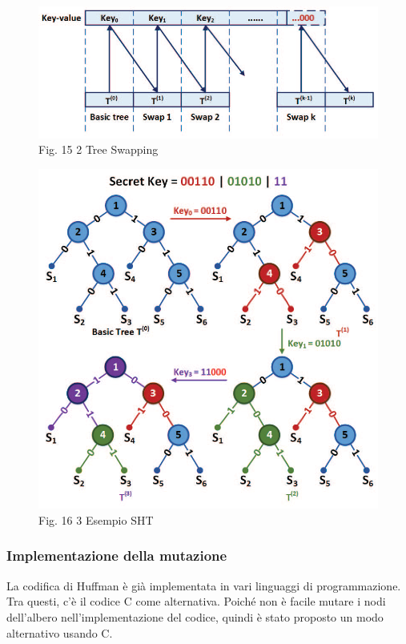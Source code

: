 \documentclass[a4paper]{report} %
\begin{document}
\begin{figure}
\centering
\includegraphics[scale=.5]{Immagini/SHT2.png}
Fig. 15 2 Tree Swapping
\end{figure}

\begin{figure}
\centering
\includegraphics[scale=.5]{Immagini/SHT3.png}
Fig. 16 3 Esempio SHT
\end{figure}

\subsubsection{Implementazione della mutazione}
La codifica di Huffman è già implementata in vari linguaggi di programmazione. Tra questi, c'è il codice C come alternativa. Poiché non è facile mutare i nodi dell'albero nell'implementazione del codice, quindi è stato proposto un modo alternativo usando C.
\end{document}
